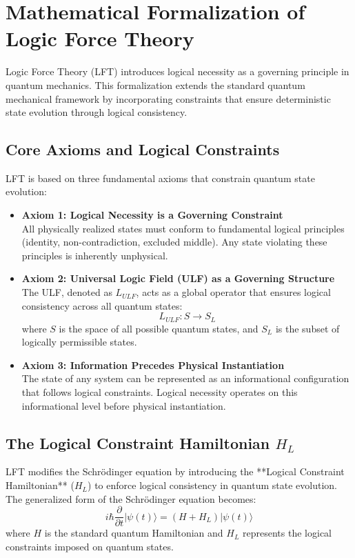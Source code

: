 \section{Mathematical Formalization of Logic Force Theory}

Logic Force Theory (LFT) introduces logical necessity as a governing principle in quantum mechanics. This formalization extends the standard quantum mechanical framework by incorporating constraints that ensure deterministic state evolution through logical consistency.

\subsection{Core Axioms and Logical Constraints}
LFT is based on three fundamental axioms that constrain quantum state evolution:

\begin{itemize}
    \item \textbf{Axiom 1: Logical Necessity is a Governing Constraint} \\
    All physically realized states must conform to fundamental logical principles (identity, non-contradiction, excluded middle). Any state violating these principles is inherently unphysical.
    
    \item \textbf{Axiom 2: Universal Logic Field (ULF) as a Governing Structure} \\
    The ULF, denoted as $L_{ULF}$, acts as a global operator that ensures logical consistency across all quantum states:
    \[
    L_{ULF}: S \to S_L
    \]
    where $S$ is the space of all possible quantum states, and $S_L$ is the subset of logically permissible states.

    \item \textbf{Axiom 3: Information Precedes Physical Instantiation} \\
    The state of any system can be represented as an informational configuration that follows logical constraints. Logical necessity operates on this informational level before physical instantiation.
\end{itemize}

\subsection{The Logical Constraint Hamiltonian $H_L$}
LFT modifies the Schrödinger equation by introducing the **Logical Constraint Hamiltonian** ($H_L$) to enforce logical consistency in quantum state evolution. The generalized form of the Schrödinger equation becomes:
\[
i\hbar \frac{\partial}{\partial t} |\psi(t)\rangle = (H + H_L) |\psi(t)\rangle
\]
where $H$ is the standard quantum Hamiltonian and $H_L$ represents the logical constraints imposed on quantum states.

